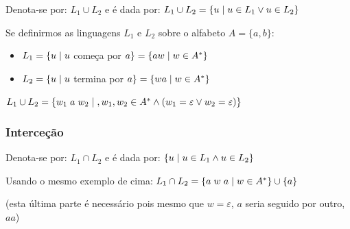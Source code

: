 \documentclass{article}
\begin{document}
\begin{flushleft}
  \item Denota-se por: $L_1 \cup L_2$ e é dada por: $L_1 \cup L_2 = \{u \hspace{1mm} | \hspace{1mm} u \in L_1 \vee u \in L_2 \}$
  \item Se definirmos as linguagens $L_1$ e $L_2$ sobre o alfabeto $A = \{a,b\}$:
  \begin{itemize}
    \item $L_1 = \{u \hspace{1mm} | \hspace{1mm} u$ começa por $a\} = \{a w \hspace{1mm} | \hspace{1mm} w \in A^*\}$
    \item $L_2 = \{u \hspace{1mm} | \hspace{1mm} u$ termina por $a\} = \{w a \hspace{1mm} | \hspace{1mm} w \in A^*\}$
  \end{itemize}
  \item $L_1 \cup L_2 = \{w_1 \hspace{1mm} a \hspace{1mm} w_2 \hspace{1mm} | \hspace{1mm}, w_1,w_2 \in A^* \wedge (w_1 = \varepsilon \vee w_2 = \varepsilon)\}$
\end{flushleft}

\subsubsection{Interceção}

\begin{flushleft}
  \item Denota-se por: $L_1 \cap L_2$ e é dada por: $\{u \hspace{1mm} | \hspace{1mm} u \in L_1 \wedge u \in L_2\}$
  \item Usando o mesmo exemplo de cima: $L_1 \cap L_2 = \{a \hspace{1mm} w \hspace{1mm} a \hspace{1mm} | \hspace{1mm} w \in A^*\} \cup \{a\}$

  (esta última parte é necessário pois mesmo que $w = \varepsilon$, $a$ seria seguido por outro, $aa$)

\end{flushleft}
\end{document}
